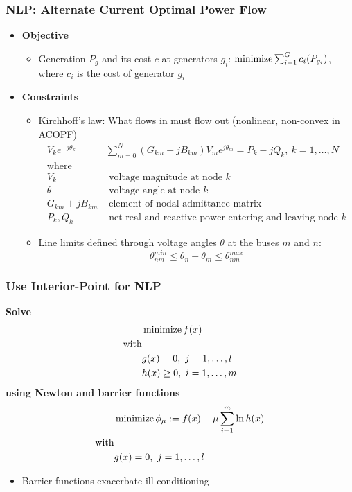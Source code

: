 \begin{frame}[fragile]
  \frametitle{NLP: Alternate Current Optimal Power Flow}
  \begin{itemize}
    \item {\bf Objective}
    \begin{itemize}
      \item Generation $P_g$ and its cost $c$ at generators $g_i$:
      $ \minimize \sum^G_{i=1} c_i(P_{g_i})$, where $c_i$ is the cost of generator $g_i$
    \end{itemize}
    \item {\bf Constraints}
    \begin{itemize}
      \item Kirchhoff's law: What flows in must flow out (nonlinear, non-convex in ACOPF)
      \begin{align*}
        V_k e^{-j\theta_k} & \sum^{N}_{m=0} (G_{km} + jB_{km})V_m e^{j\theta_m} = P_k - j Q_k,\ k = 1, \dots, N \\
        \text{where}\\
        V_k &\text{ voltage magnitude at node } k\\
        \theta &\text{ voltage angle at node } k\\
        G_{km} + jB_{km}& \text{ element of nodal admittance matrix}\\
        P_k , Q_k &\text{ net real and reactive power entering and leaving node } k
      \end{align*}
      \item Line limits defined through voltage angles $\theta$ at the buses $m$ and $n$:
      $$ \theta^{min}_{nm} \leq \theta_n - \theta_m \leq \theta^{max}_{nm}$$
    \end{itemize}
  \end{itemize}
\end{frame}

\begin{frame}[fragile]
  \frametitle{Use Interior-Point for NLP}
  {\bf Solve}
  \begin{align*}
  &\minimize f(x)\\ 
  \text{with}&\\
  &g(x) = 0, \ j=1,\dots, l \\
  &h(x) \geq 0, \ i=1,\dots, m \\
  \end{align*}
  {\bf using Newton and barrier functions}
  \begin{align*}
  &\minimize \phi_\mu := f(x) - \mu \sum^m_{i=1} \ln h(x)\\ 
  \text{with}&\\
  &g(x) = 0, \ j=1,\dots, l 
  \end{align*}
  \begin{itemize}
    \item Barrier functions exacerbate ill-conditioning
  \end{itemize}
\end{frame}

